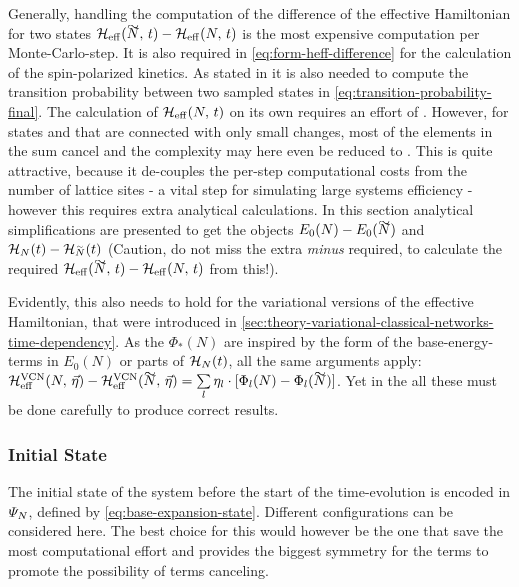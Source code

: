 Generally, handling the computation of the difference of the effective Hamiltonian for two states $\HeffOft[\vphantom{N}\smash{\tilde{N}}]-\HeffOft[N]$ is the most expensive computation per Monte-Carlo-step.
It is also required in \autoref{eq:form-heff-difference} for the calculation of the spin-polarized kinetics.
As stated in  it is also needed to compute the transition probability between two sampled states in \autoref{eq:transition-probability-final}.
The calculation of $\HeffOft[N]$ on its own requires an effort of .
However, for states \ketN[N] and  that are connected with only small changes, most of the elements in the sum cancel and the complexity may here even be reduced to .
This is quite attractive, because it de-couples the per-step computational costs from the number of lattice sites - a vital step for simulating large systems efficiency - however this requires extra analytical calculations.
In this section analytical simplifications are presented to get the objects $E_0(N)-E_0(\vphantom{N}\smash{\tilde{N}})$ and $\HNOft - \HNOft[\vphantom{N}\smash{\tilde{N}}]$ (Caution, do not miss the extra \emph{minus} required, to calculate the required $\HeffOft[\vphantom{N}\smash{\tilde{N}}]-\HeffOft[N]$ from this!).

Evidently, this also needs to hold for the variational versions of the effective Hamiltonian, that were introduced in \autoref{sec:theory-variational-classical-networks-time-dependency}.
As the $\Phi_\ast(N)$ are inspired by the form of the base-energy-terms in $E_0(N)$ or parts of $\HNOft$, all the same arguments apply: 
$\Heffvcn{N}{\vec{\eta}} - \Heffvcn{\vphantom{N}\smash{\tilde{N}}}{\vec{\eta}} = \lsum[l] \eta_l \cdot \left[\Phi_l(N) - \Phi_l(\vphantom{N}\smash{\tilde{N}})\right]$.
Yet in the all these must be done carefully to produce correct results.

\subsubsection*{Initial State}

The initial state of the system before the start of the time-evolution is encoded in $\psiN$, defined by \autoref{eq:base-expansion-state}. Different configurations can be considered here.
The best choice for this would however be the one that save the most computational effort and provides the biggest symmetry for the terms to promote the possibility of terms canceling.

